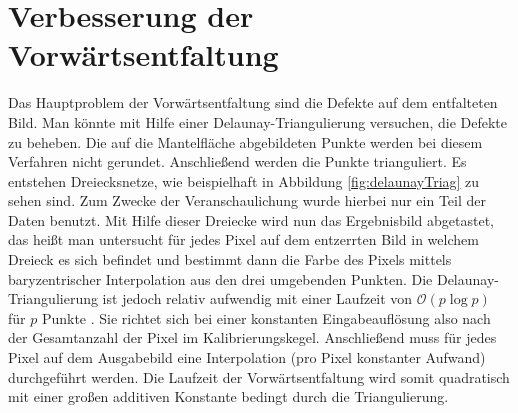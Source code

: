 \section{Verbesserung der Vorwärtsentfaltung}
Das Hauptproblem der Vorwärtsentfaltung sind die Defekte auf dem entfalteten Bild. Man könnte mit Hilfe einer Delaunay-Triangulierung versuchen, die Defekte zu beheben.
Die auf die Mantelfläche abgebildeten Punkte werden bei diesem Verfahren nicht gerundet. Anschließend werden die Punkte trianguliert. Es entstehen Dreiecksnetze, wie beispielhaft in Abbildung \ref{fig:delaunayTriag} zu sehen sind. Zum Zwecke der Veranschaulichung wurde hierbei nur ein Teil der Daten benutzt. Mit Hilfe dieser Dreiecke wird nun das Ergebnisbild abgetastet, das heißt man untersucht für jedes Pixel auf dem entzerrten Bild in welchem Dreieck es sich befindet und bestimmt dann die Farbe des Pixels mittels baryzentrischer  Interpolation aus den drei umgebenden Punkten. Die Delaunay-Triangulierung ist jedoch relativ aufwendig mit einer Laufzeit von $\mathcal{O}(p\log p)$ für $p$ Punkte \cite{Su1997}. Sie richtet sich bei einer konstanten Eingabeauflösung also nach der Gesamtanzahl der Pixel im Kalibrierungskegel. Anschließend muss für jedes Pixel auf dem Ausgabebild eine Interpolation (pro Pixel konstanter Aufwand) durchgeführt werden. Die Laufzeit der Vorwärtsentfaltung wird somit quadratisch mit einer großen additiven Konstante bedingt durch die Triangulierung.

